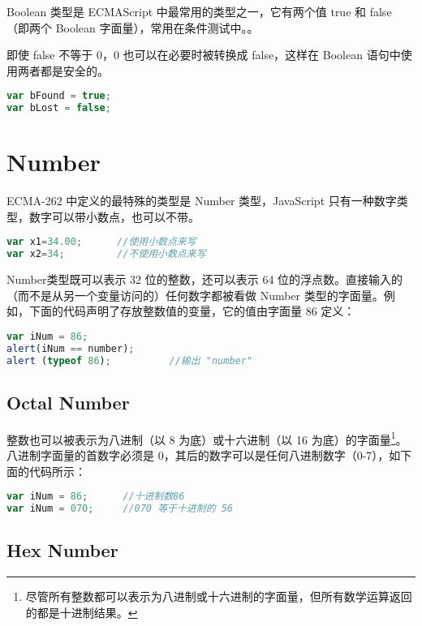 Boolean 类型是 ECMAScript 中最常用的类型之一，它有两个值 true 和 false （即两个 Boolean 字面量），常用在条件测试中。。


即使 false 不等于 0，0 也可以在必要时被转换成 false，这样在 Boolean 语句中使用两者都是安全的。


\begin{lstlisting}[language=JavaScript]
var bFound = true;
var bLost = false;
\end{lstlisting}





\section{Number}

ECMA-262 中定义的最特殊的类型是 Number 类型，JavaScript 只有一种数字类型，数字可以带小数点，也可以不带。

\begin{lstlisting}[language=JavaScript]
var x1=34.00;      //使用小数点来写
var x2=34;         //不使用小数点来写
\end{lstlisting}



Number类型既可以表示 32 位的整数，还可以表示 64 位的浮点数。直接输入的（而不是从另一个变量访问的）任何数字都被看做 Number 类型的字面量。例如，下面的代码声明了存放整数值的变量，它的值由字面量 86 定义：


\begin{lstlisting}[language=JavaScript]
var iNum = 86;
alert(iNum == number);
alert (typeof 86);    		//输出 "number"
\end{lstlisting}


\subsection{Octal Number}


整数也可以被表示为八进制（以 8 为底）或十六进制（以 16 为底）的字面量\footnote{尽管所有整数都可以表示为八进制或十六进制的字面量，但所有数学运算返回的都是十进制结果。}。八进制字面量的首数字必须是 0，其后的数字可以是任何八进制数字（0-7），如下面的代码所示：



\begin{lstlisting}[language=JavaScript]
var iNum = 86;		//十进制数86
var iNum = 070;  	//070 等于十进制的 56
\end{lstlisting}


\subsection{Hex Number}



